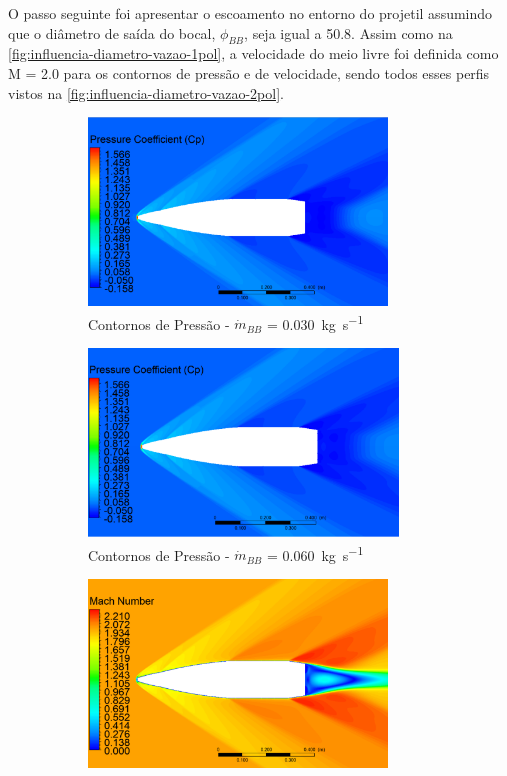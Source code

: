 O passo seguinte foi apresentar o escoamento no entorno do projetil assumindo que o diâmetro de saída do bocal, \(\phi_{BB}\), seja igual a \qty{50,8}{\millimetre}. Assim como na \autoref{fig:influencia-diametro-vazao-1pol}, a velocidade do meio livre foi definida como M = \num{2,0} para os contornos de pressão e de velocidade, sendo todos esses perfis vistos na \autoref{fig:influencia-diametro-vazao-2pol}.

\begin{figure}[!ht]
	\centering
	\begin{subfigure}[b]{0.47\textwidth} %
        \centering
        \includegraphics[height=5cm,width=\textwidth]{contorno-pressao-2306K-vazao-0030-2pol.png}
        \caption{Contornos de Pressão - \(\Dot{m}_{BB}\) = \qty{0,030}{\kilogram\per\second}}
        \label{fig:contorno-pressao-bb-2pol-vazao0030}
    \end{subfigure}
    \hfill
    \begin{subfigure}[b]{0.47\textwidth} %
        \centering
        \includegraphics[height=5cm,width=\textwidth]{contorno-pressao-2306K-vazao-0060-2pol.png}
        \caption{Contornos de Pressão - \(\Dot{m}_{BB}\) = \qty{0,060}{\kilogram\per\second}}
        \label{fig:contorno-pressao-bb-2pol-vazao0060}
    \end{subfigure}
    \hfill
    \begin{subfigure}[b]{0.47\textwidth} %
        \centering
        \includegraphics[height=5cm,width=\textwidth]{contorno-velocidade-2306K-vazao-0030-2pol.png}

\end{subfigure}
\end{figure}
